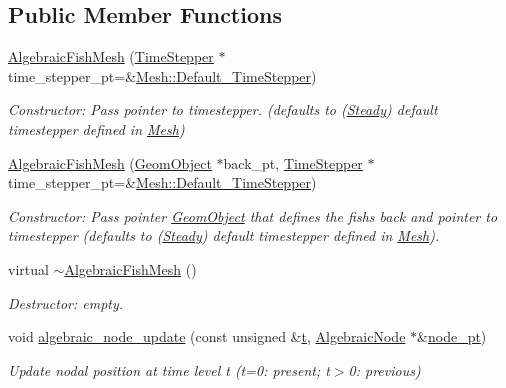 \subsection*{Public Member Functions}
\begin{DoxyCompactItemize}
\item 
\hyperlink{classoomph_1_1AlgebraicFishMesh_a4382cbf0c75b2b76c9b28e9bae45fd4f}{Algebraic\+Fish\+Mesh} (\hyperlink{classoomph_1_1TimeStepper}{Time\+Stepper} $\ast$time\+\_\+stepper\+\_\+pt=\&\hyperlink{classoomph_1_1Mesh_a12243d0fee2b1fcee729ee5a4777ea10}{Mesh\+::\+Default\+\_\+\+Time\+Stepper})
\begin{DoxyCompactList}\small\item\em Constructor\+: Pass pointer to timestepper. (defaults to (\hyperlink{classoomph_1_1Steady}{Steady}) default timestepper defined in \hyperlink{classoomph_1_1Mesh}{Mesh}) \end{DoxyCompactList}\item 
\hyperlink{classoomph_1_1AlgebraicFishMesh_aac4b7f18a6e1d10c64edf431af921ce7}{Algebraic\+Fish\+Mesh} (\hyperlink{classoomph_1_1GeomObject}{Geom\+Object} $\ast$back\+\_\+pt, \hyperlink{classoomph_1_1TimeStepper}{Time\+Stepper} $\ast$time\+\_\+stepper\+\_\+pt=\&\hyperlink{classoomph_1_1Mesh_a12243d0fee2b1fcee729ee5a4777ea10}{Mesh\+::\+Default\+\_\+\+Time\+Stepper})
\begin{DoxyCompactList}\small\item\em Constructor\+: Pass pointer \hyperlink{classoomph_1_1GeomObject}{Geom\+Object} that defines the fish\textquotesingle{}s back and pointer to timestepper (defaults to (\hyperlink{classoomph_1_1Steady}{Steady}) default timestepper defined in \hyperlink{classoomph_1_1Mesh}{Mesh}). \end{DoxyCompactList}\item 
virtual \hyperlink{classoomph_1_1AlgebraicFishMesh_a027d54d158e22ce8fe3c1246cb030440}{$\sim$\+Algebraic\+Fish\+Mesh} ()
\begin{DoxyCompactList}\small\item\em Destructor\+: empty. \end{DoxyCompactList}\item 
void \hyperlink{classoomph_1_1AlgebraicFishMesh_ac66d6542472dac702a7414aa9d7f995f}{algebraic\+\_\+node\+\_\+update} (const unsigned \&\hyperlink{cfortran_8h_af6f0bd3dc13317f895c91323c25c2b8f}{t}, \hyperlink{classoomph_1_1AlgebraicNode}{Algebraic\+Node} $\ast$\&\hyperlink{classoomph_1_1AlgebraicMesh_aedeebbe95d2f8e67e9939cecd1be3933}{node\+\_\+pt})
\begin{DoxyCompactList}\small\item\em Update nodal position at time level t (t=0\+: present; t$>$0\+: previous) \end{DoxyCompactList}\item 

\end{DoxyCompactItemize}
